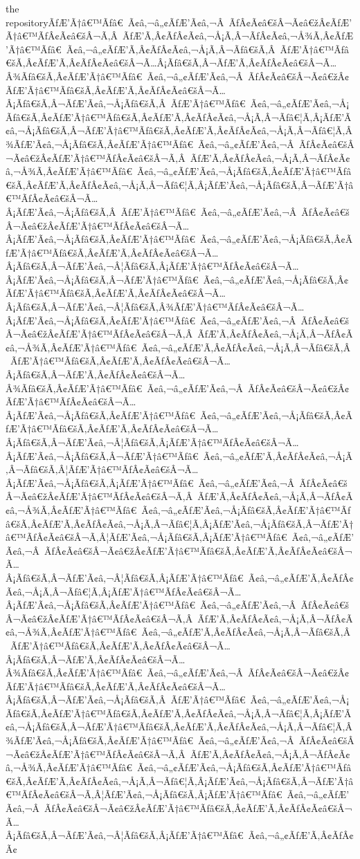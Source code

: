 \documentclass{article}
\begin{document}
\begin{outline}[enumerate]
\2 the repositoryÃƒÆ’Ã†â€™Ãƒâ€ Ã¢â‚¬â„¢ÃƒÆ’Ã¢â‚¬Â ÃƒÂ¢Ã¢â€šÂ¬Ã¢â€žÂ¢ÃƒÆ’Ã†â€™ÃƒÂ¢Ã¢â€šÂ¬Ã‚Â ÃƒÆ’Ã‚Â¢ÃƒÂ¢Ã¢â‚¬Å¡Ã‚Â¬ÃƒÂ¢Ã¢â‚¬Å¾Ã‚Â¢ÃƒÆ’Ã†â€™Ãƒâ€ Ã¢â‚¬â„¢ÃƒÆ’Ã‚Â¢ÃƒÂ¢Ã¢â‚¬Å¡Ã‚Â¬Ãƒâ€šÃ‚Â ÃƒÆ’Ã†â€™Ãƒâ€šÃ‚Â¢ÃƒÆ’Ã‚Â¢ÃƒÂ¢Ã¢â€šÂ¬Ã…Â¡Ãƒâ€šÃ‚Â¬ÃƒÆ’Ã‚Â¢ÃƒÂ¢Ã¢â€šÂ¬Ã…Â¾Ãƒâ€šÃ‚Â¢ÃƒÆ’Ã†â€™Ãƒâ€ Ã¢â‚¬â„¢ÃƒÆ’Ã¢â‚¬Â ÃƒÂ¢Ã¢â€šÂ¬Ã¢â€žÂ¢ÃƒÆ’Ã†â€™Ãƒâ€šÃ‚Â¢ÃƒÆ’Ã‚Â¢ÃƒÂ¢Ã¢â€šÂ¬Ã…Â¡Ãƒâ€šÃ‚Â¬ÃƒÆ’Ã¢â‚¬Å¡Ãƒâ€šÃ‚Â ÃƒÆ’Ã†â€™Ãƒâ€ Ã¢â‚¬â„¢ÃƒÆ’Ã¢â‚¬Å¡Ãƒâ€šÃ‚Â¢ÃƒÆ’Ã†â€™Ãƒâ€šÃ‚Â¢ÃƒÆ’Ã‚Â¢ÃƒÂ¢Ã¢â‚¬Å¡Ã‚Â¬Ãƒâ€¦Ã‚Â¡ÃƒÆ’Ã¢â‚¬Å¡Ãƒâ€šÃ‚Â¬ÃƒÆ’Ã†â€™Ãƒâ€šÃ‚Â¢ÃƒÆ’Ã‚Â¢ÃƒÂ¢Ã¢â‚¬Å¡Ã‚Â¬Ãƒâ€¦Ã‚Â¾ÃƒÆ’Ã¢â‚¬Å¡Ãƒâ€šÃ‚Â¢ÃƒÆ’Ã†â€™Ãƒâ€ Ã¢â‚¬â„¢ÃƒÆ’Ã¢â‚¬Â ÃƒÂ¢Ã¢â€šÂ¬Ã¢â€žÂ¢ÃƒÆ’Ã†â€™ÃƒÂ¢Ã¢â€šÂ¬Ã‚Â ÃƒÆ’Ã‚Â¢ÃƒÂ¢Ã¢â‚¬Å¡Ã‚Â¬ÃƒÂ¢Ã¢â‚¬Å¾Ã‚Â¢ÃƒÆ’Ã†â€™Ãƒâ€ Ã¢â‚¬â„¢ÃƒÆ’Ã¢â‚¬Å¡Ãƒâ€šÃ‚Â¢ÃƒÆ’Ã†â€™Ãƒâ€šÃ‚Â¢ÃƒÆ’Ã‚Â¢ÃƒÂ¢Ã¢â‚¬Å¡Ã‚Â¬Ãƒâ€¦Ã‚Â¡ÃƒÆ’Ã¢â‚¬Å¡Ãƒâ€šÃ‚Â¬ÃƒÆ’Ã†â€™ÃƒÂ¢Ã¢â€šÂ¬Ã…Â¡ÃƒÆ’Ã¢â‚¬Å¡Ãƒâ€šÃ‚Â ÃƒÆ’Ã†â€™Ãƒâ€ Ã¢â‚¬â„¢ÃƒÆ’Ã¢â‚¬Â ÃƒÂ¢Ã¢â€šÂ¬Ã¢â€žÂ¢ÃƒÆ’Ã†â€™ÃƒÂ¢Ã¢â€šÂ¬Ã…Â¡ÃƒÆ’Ã¢â‚¬Å¡Ãƒâ€šÃ‚Â¢ÃƒÆ’Ã†â€™Ãƒâ€ Ã¢â‚¬â„¢ÃƒÆ’Ã¢â‚¬Å¡Ãƒâ€šÃ‚Â¢ÃƒÆ’Ã†â€™Ãƒâ€šÃ‚Â¢ÃƒÆ’Ã‚Â¢ÃƒÂ¢Ã¢â€šÂ¬Ã…Â¡Ãƒâ€šÃ‚Â¬ÃƒÆ’Ã¢â‚¬Â¦Ãƒâ€šÃ‚Â¡ÃƒÆ’Ã†â€™ÃƒÂ¢Ã¢â€šÂ¬Ã…Â¡ÃƒÆ’Ã¢â‚¬Å¡Ãƒâ€šÃ‚Â¬ÃƒÆ’Ã†â€™Ãƒâ€ Ã¢â‚¬â„¢ÃƒÆ’Ã¢â‚¬Å¡Ãƒâ€šÃ‚Â¢ÃƒÆ’Ã†â€™Ãƒâ€šÃ‚Â¢ÃƒÆ’Ã‚Â¢ÃƒÂ¢Ã¢â€šÂ¬Ã…Â¡Ãƒâ€šÃ‚Â¬ÃƒÆ’Ã¢â‚¬Â¦Ãƒâ€šÃ‚Â¾ÃƒÆ’Ã†â€™ÃƒÂ¢Ã¢â€šÂ¬Ã…Â¡ÃƒÆ’Ã¢â‚¬Å¡Ãƒâ€šÃ‚Â¢ÃƒÆ’Ã†â€™Ãƒâ€ Ã¢â‚¬â„¢ÃƒÆ’Ã¢â‚¬Â ÃƒÂ¢Ã¢â€šÂ¬Ã¢â€žÂ¢ÃƒÆ’Ã†â€™ÃƒÂ¢Ã¢â€šÂ¬Ã‚Â ÃƒÆ’Ã‚Â¢ÃƒÂ¢Ã¢â‚¬Å¡Ã‚Â¬ÃƒÂ¢Ã¢â‚¬Å¾Ã‚Â¢ÃƒÆ’Ã†â€™Ãƒâ€ Ã¢â‚¬â„¢ÃƒÆ’Ã‚Â¢ÃƒÂ¢Ã¢â‚¬Å¡Ã‚Â¬Ãƒâ€šÃ‚Â ÃƒÆ’Ã†â€™Ãƒâ€šÃ‚Â¢ÃƒÆ’Ã‚Â¢ÃƒÂ¢Ã¢â€šÂ¬Ã…Â¡Ãƒâ€šÃ‚Â¬ÃƒÆ’Ã‚Â¢ÃƒÂ¢Ã¢â€šÂ¬Ã…Â¾Ãƒâ€šÃ‚Â¢ÃƒÆ’Ã†â€™Ãƒâ€ Ã¢â‚¬â„¢ÃƒÆ’Ã¢â‚¬Â ÃƒÂ¢Ã¢â€šÂ¬Ã¢â€žÂ¢ÃƒÆ’Ã†â€™ÃƒÂ¢Ã¢â€šÂ¬Ã…Â¡ÃƒÆ’Ã¢â‚¬Å¡Ãƒâ€šÃ‚Â¢ÃƒÆ’Ã†â€™Ãƒâ€ Ã¢â‚¬â„¢ÃƒÆ’Ã¢â‚¬Å¡Ãƒâ€šÃ‚Â¢ÃƒÆ’Ã†â€™Ãƒâ€šÃ‚Â¢ÃƒÆ’Ã‚Â¢ÃƒÂ¢Ã¢â€šÂ¬Ã…Â¡Ãƒâ€šÃ‚Â¬ÃƒÆ’Ã¢â‚¬Â¦Ãƒâ€šÃ‚Â¡ÃƒÆ’Ã†â€™ÃƒÂ¢Ã¢â€šÂ¬Ã…Â¡ÃƒÆ’Ã¢â‚¬Å¡Ãƒâ€šÃ‚Â¬ÃƒÆ’Ã†â€™Ãƒâ€ Ã¢â‚¬â„¢ÃƒÆ’Ã‚Â¢ÃƒÂ¢Ã¢â‚¬Å¡Ã‚Â¬Ãƒâ€šÃ‚Â¦ÃƒÆ’Ã†â€™ÃƒÂ¢Ã¢â€šÂ¬Ã…Â¡ÃƒÆ’Ã¢â‚¬Å¡Ãƒâ€šÃ‚Â¡ÃƒÆ’Ã†â€™Ãƒâ€ Ã¢â‚¬â„¢ÃƒÆ’Ã¢â‚¬Â ÃƒÂ¢Ã¢â€šÂ¬Ã¢â€žÂ¢ÃƒÆ’Ã†â€™ÃƒÂ¢Ã¢â€šÂ¬Ã‚Â ÃƒÆ’Ã‚Â¢ÃƒÂ¢Ã¢â‚¬Å¡Ã‚Â¬ÃƒÂ¢Ã¢â‚¬Å¾Ã‚Â¢ÃƒÆ’Ã†â€™Ãƒâ€ Ã¢â‚¬â„¢ÃƒÆ’Ã¢â‚¬Å¡Ãƒâ€šÃ‚Â¢ÃƒÆ’Ã†â€™Ãƒâ€šÃ‚Â¢ÃƒÆ’Ã‚Â¢ÃƒÂ¢Ã¢â‚¬Å¡Ã‚Â¬Ãƒâ€¦Ã‚Â¡ÃƒÆ’Ã¢â‚¬Å¡Ãƒâ€šÃ‚Â¬ÃƒÆ’Ã†â€™ÃƒÂ¢Ã¢â€šÂ¬Ã‚Â¦ÃƒÆ’Ã¢â‚¬Å¡Ãƒâ€šÃ‚Â¡ÃƒÆ’Ã†â€™Ãƒâ€ Ã¢â‚¬â„¢ÃƒÆ’Ã¢â‚¬Â ÃƒÂ¢Ã¢â€šÂ¬Ã¢â€žÂ¢ÃƒÆ’Ã†â€™Ãƒâ€šÃ‚Â¢ÃƒÆ’Ã‚Â¢ÃƒÂ¢Ã¢â€šÂ¬Ã…Â¡Ãƒâ€šÃ‚Â¬ÃƒÆ’Ã¢â‚¬Â¦Ãƒâ€šÃ‚Â¡ÃƒÆ’Ã†â€™Ãƒâ€ Ã¢â‚¬â„¢ÃƒÆ’Ã‚Â¢ÃƒÂ¢Ã¢â‚¬Å¡Ã‚Â¬Ãƒâ€¦Ã‚Â¡ÃƒÆ’Ã†â€™ÃƒÂ¢Ã¢â€šÂ¬Ã…Â¡ÃƒÆ’Ã¢â‚¬Å¡Ãƒâ€šÃ‚Â¢ÃƒÆ’Ã†â€™Ãƒâ€ Ã¢â‚¬â„¢ÃƒÆ’Ã¢â‚¬Â ÃƒÂ¢Ã¢â€šÂ¬Ã¢â€žÂ¢ÃƒÆ’Ã†â€™ÃƒÂ¢Ã¢â€šÂ¬Ã‚Â ÃƒÆ’Ã‚Â¢ÃƒÂ¢Ã¢â‚¬Å¡Ã‚Â¬ÃƒÂ¢Ã¢â‚¬Å¾Ã‚Â¢ÃƒÆ’Ã†â€™Ãƒâ€ Ã¢â‚¬â„¢ÃƒÆ’Ã‚Â¢ÃƒÂ¢Ã¢â‚¬Å¡Ã‚Â¬Ãƒâ€šÃ‚Â ÃƒÆ’Ã†â€™Ãƒâ€šÃ‚Â¢ÃƒÆ’Ã‚Â¢ÃƒÂ¢Ã¢â€šÂ¬Ã…Â¡Ãƒâ€šÃ‚Â¬ÃƒÆ’Ã‚Â¢ÃƒÂ¢Ã¢â€šÂ¬Ã…Â¾Ãƒâ€šÃ‚Â¢ÃƒÆ’Ã†â€™Ãƒâ€ Ã¢â‚¬â„¢ÃƒÆ’Ã¢â‚¬Â ÃƒÂ¢Ã¢â€šÂ¬Ã¢â€žÂ¢ÃƒÆ’Ã†â€™Ãƒâ€šÃ‚Â¢ÃƒÆ’Ã‚Â¢ÃƒÂ¢Ã¢â€šÂ¬Ã…Â¡Ãƒâ€šÃ‚Â¬ÃƒÆ’Ã¢â‚¬Å¡Ãƒâ€šÃ‚Â ÃƒÆ’Ã†â€™Ãƒâ€ Ã¢â‚¬â„¢ÃƒÆ’Ã¢â‚¬Å¡Ãƒâ€šÃ‚Â¢ÃƒÆ’Ã†â€™Ãƒâ€šÃ‚Â¢ÃƒÆ’Ã‚Â¢ÃƒÂ¢Ã¢â‚¬Å¡Ã‚Â¬Ãƒâ€¦Ã‚Â¡ÃƒÆ’Ã¢â‚¬Å¡Ãƒâ€šÃ‚Â¬ÃƒÆ’Ã†â€™Ãƒâ€šÃ‚Â¢ÃƒÆ’Ã‚Â¢ÃƒÂ¢Ã¢â‚¬Å¡Ã‚Â¬Ãƒâ€¦Ã‚Â¾ÃƒÆ’Ã¢â‚¬Å¡Ãƒâ€šÃ‚Â¢ÃƒÆ’Ã†â€™Ãƒâ€ Ã¢â‚¬â„¢ÃƒÆ’Ã¢â‚¬Â ÃƒÂ¢Ã¢â€šÂ¬Ã¢â€žÂ¢ÃƒÆ’Ã†â€™ÃƒÂ¢Ã¢â€šÂ¬Ã‚Â ÃƒÆ’Ã‚Â¢ÃƒÂ¢Ã¢â‚¬Å¡Ã‚Â¬ÃƒÂ¢Ã¢â‚¬Å¾Ã‚Â¢ÃƒÆ’Ã†â€™Ãƒâ€ Ã¢â‚¬â„¢ÃƒÆ’Ã¢â‚¬Å¡Ãƒâ€šÃ‚Â¢ÃƒÆ’Ã†â€™Ãƒâ€šÃ‚Â¢ÃƒÆ’Ã‚Â¢ÃƒÂ¢Ã¢â‚¬Å¡Ã‚Â¬Ãƒâ€¦Ã‚Â¡ÃƒÆ’Ã¢â‚¬Å¡Ãƒâ€šÃ‚Â¬ÃƒÆ’Ã†â€™ÃƒÂ¢Ã¢â€šÂ¬Ã‚Â¦ÃƒÆ’Ã¢â‚¬Å¡Ãƒâ€šÃ‚Â¡ÃƒÆ’Ã†â€™Ãƒâ€ Ã¢â‚¬â„¢ÃƒÆ’Ã¢â‚¬Â ÃƒÂ¢Ã¢â€šÂ¬Ã¢â€žÂ¢ÃƒÆ’Ã†â€™Ãƒâ€šÃ‚Â¢ÃƒÆ’Ã‚Â¢ÃƒÂ¢Ã¢â€šÂ¬Ã…Â¡Ãƒâ€šÃ‚Â¬ÃƒÆ’Ã¢â‚¬Â¦Ãƒâ€šÃ‚Â¡ÃƒÆ’Ã†â€™Ãƒâ€ Ã¢â‚¬â„¢ÃƒÆ’Ã‚Â¢ÃƒÂ¢Ã¢
\end{outline}
\end{document}
